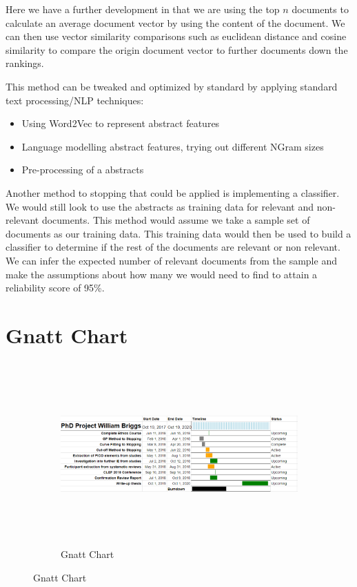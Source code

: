 Here we have a further development in that we are using the top $n$ documents to calculate an average document vector by using the content of the document. We can then use vector similarity comparisons such as euclidean distance and cosine similarity to compare the origin document vector to further documents down the rankings.

This method can be tweaked and optimized by standard by applying standard text processing/NLP techniques:

\begin{itemize}
  \item Using Word2Vec to represent abstract features
  \item Language modelling abstract features, trying out different NGram sizes
  \item Pre-processing of a abstracts
  
\end{itemize}

Another method to stopping that could be applied is implementing a classifier. We would still look to use the abstracts as training data for relevant and non-relevant documents. This method would assume we take a sample set of documents as our training data. This training data would then be used to build a classifier to determine if the rest of the documents are relevant or non relevant. We can infer the expected number of relevant documents from the sample and make the assumptions about how many we would need to find to attain a reliability score of 95\%.



\section{Gnatt Chart}

\begin{figure}


\begin{figure}[H]
\center
\includegraphics[height=7cm]{figures/gnatt.png}
\caption{Gnatt Chart}
\end{figure}
\end{figure}



